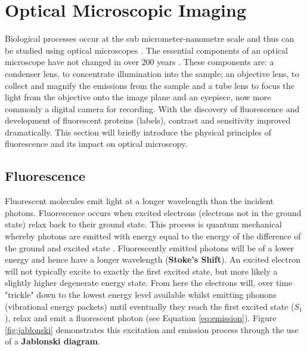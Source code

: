 \section{Optical Microscopic Imaging}

Biological processes occur at the sub micrometer-nanometre scale and thus can be studied using optical microscopes \cite{Murphy2012e}. %
The essential components of an optical microscope have not changed in over 200 years \cite{Bradbury1998,Masters2001b}. These components are: a condenser lens, to concentrate illumination into the sample; an objective lens, to collect and magnify the emissions from the sample and a tube lens to focus the light from the objective onto the image plane and an eyepiece, now more commonly a digital camera for recording. With the discovery of fluorescence and development of fluorescent proteins (labels), contrast and sensitivity improved dramatically. This section will briefly introduce the physical principles of fluorescence and its impact on optical microscopy.

\subsection{Fluorescence}

Fluorescent molecules emit light at a longer wavelength than the incident photons. Fluorescence occurs when excited electrons (electrons not in the ground state) relax back to their ground state. This process is quantum mechanical whereby photons are emitted with energy equal to the energy of the difference of the ground and excited state \cite{Lakowicz2007}.
Fluorescently emitted photons will be of a lower energy and hence have a longer wavelength (\textbf{Stoke's Shift}). An excited electron will not typically excite to exactly the first excited state, but more likely a slightly higher degenerate energy state. From here the electrons will, over time "trickle" down to the lowest energy level available whilst emitting phonons (vibrational energy packets) until eventually they reach the first excited state ($S_1$), relax and emit a fluorescent photon (see Equation \eqref{eq:emission}). Figure \ref{fig:jablonski} demonstrates this excitation and emission process through the use of a \textbf{Jablonski diagram}.

